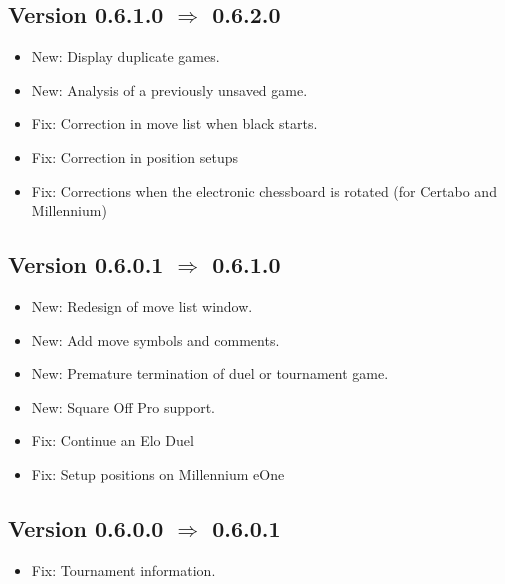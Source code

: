 \documentclass[11pt,a4paper]{article}
\begin{document}
\subsection*{Version 0.6.1.0 $\Rightarrow$  0.6.2.0}
\begin{itemize}
	\item {\color{blue}New}: Display duplicate games.
	\item {\color{blue}New}: Analysis of a previously unsaved game.
	\item {\color{red}Fix}: Correction in move list when black starts.
	\item {\color{red}Fix}: Correction in position setups
	\item {\color{red}Fix}: Corrections when the electronic chessboard is rotated (for Certabo and Millennium)
\end{itemize}

\subsection*{Version 0.6.0.1 $\Rightarrow$  0.6.1.0}
\begin{itemize}
    \item {\color{blue}New}: Redesign of move list window.
    \item {\color{blue}New}: Add move symbols and comments.
	\item {\color{blue}New}: Premature termination of duel or tournament game.
	\item {\color{blue}New}: Square Off Pro support.	
	\item {\color{red}Fix}: Continue an Elo Duel
	\item {\color{red}Fix}: Setup positions on Millennium eOne
\end{itemize}

\subsection*{Version 0.6.0.0 $\Rightarrow$  0.6.0.1}
\begin{itemize}
	\item {\color{red}Fix}: Tournament information.		
\end{itemize}
\end{document}
